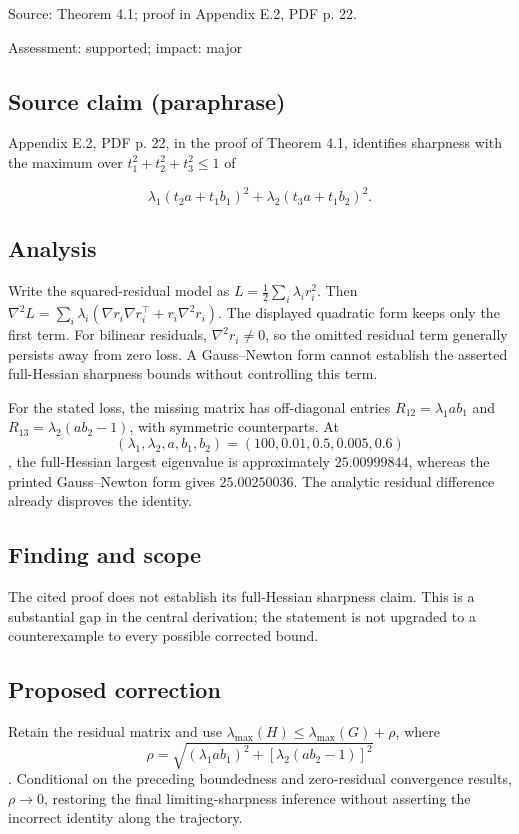 \documentclass[11pt]{article}
\begin{document}
Source: Theorem 4.1; proof in Appendix E.2, PDF p. 22.

Assessment: supported; impact: major

\subsection*{Source claim (paraphrase)}

Appendix E.2, PDF p. 22, in the proof of Theorem 4.1, identifies sharpness with the maximum over \(t_1^2+t_2^2+t_3^2\le1\) of

\[ \lambda_1(t_2a+t_1b_1)^2+ \lambda_2(t_3a+t_1b_2)^2. \]

\subsection*{Analysis}

Write the squared-residual model as \(L=\frac12\sum_i\lambda_i r_i^2\). Then \(\nabla^2L=\sum_i\lambda_i(\nabla r_i\nabla r_i^\top+r_i\nabla^2r_i)\). The displayed quadratic form keeps only the first term. For bilinear residuals, \(\nabla^2r_i\ne0\), so the omitted residual term generally persists away from zero loss. A Gauss–Newton form cannot establish the asserted full-Hessian sharpness bounds without controlling this term.

For the stated loss, the missing matrix has off-diagonal entries \(R_{12}=\lambda_1ab_1\) and \(R_{13}=\lambda_2(ab_2-1)\), with symmetric counterparts. At \[(\lambda_1,\lambda_2,a,b_1,b_2)=(100,0.01,0.5,0.005,0.6)\], the full-Hessian largest eigenvalue is approximately \(25.00999844\), whereas the printed Gauss–Newton form gives \(25.00250036\). The analytic residual difference already disproves the identity.

\subsection*{Finding and scope}

The cited proof does not establish its full-Hessian sharpness claim. This is a substantial gap in the central derivation; the statement is not upgraded to a counterexample to every possible corrected bound.

\subsection*{Proposed correction}

Retain the residual matrix and use \(\lambda_{\max}(H)\le\lambda_{\max}(G)+\rho\), where \[\rho=\sqrt{(\lambda_1ab_1)^2+[\lambda_2(ab_2-1)]^2}\]. Conditional on the preceding boundedness and zero-residual convergence results, \(\rho\to0\), restoring the final limiting-sharpness inference without asserting the incorrect identity along the trajectory.
\end{document}
